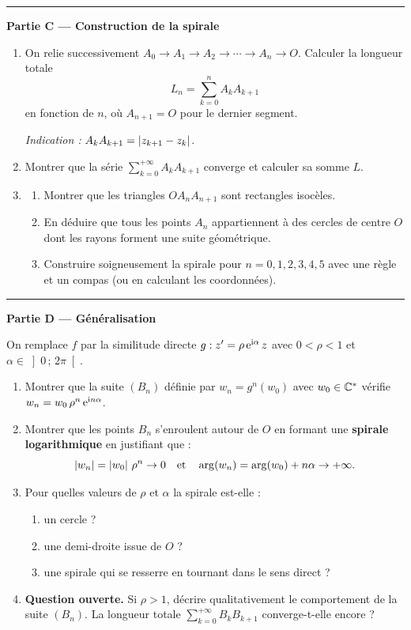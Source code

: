 \bigskip
\noindent\rule{\linewidth}{0.3pt}
\bigskip

\noindent\textbf{Partie C — Construction de la spirale}

\begin{enumerate}
	\item On relie successivement $A_0 \to A_1 \to A_2 \to \cdots \to A_n \to O$.
	Calculer la longueur totale
	$$
	L_n = \sum_{k=0}^{n} A_k A_{k+1}
	$$
	en fonction de $n$, où $A_{n+1} = O$ pour le dernier segment.

	\textit{Indication : } $A_kA_{k+1} = \left|z_{k+1} - z_k\right|$.

	\item Montrer que la série $\displaystyle\sum_{k=0}^{+\infty} A_k A_{k+1}$ converge
	et calculer sa somme $L$.

	\item \begin{enumerate}
		\item Montrer que les triangles $OA_nA_{n+1}$ sont rectangles isocèles.
		\item En déduire que tous les points $A_n$ appartiennent à des cercles
		de centre $O$ dont les rayons forment une suite géométrique.
		\item Construire soigneusement la spirale pour $n = 0, 1, 2, 3, 4, 5$
		avec une règle et un compas (ou en calculant les coordonnées).
	\end{enumerate}
\end{enumerate}

\bigskip
\noindent\rule{\linewidth}{0.3pt}
\bigskip

\noindent\textbf{Partie D — Généralisation}

On remplace $f$ par la similitude directe $g : z' = \rho\,\mathrm{e}^{\mathrm{i}\alpha}\,z$
avec $0 < \rho < 1$ et $\alpha \in \left]0\,;\,2\pi\right[$.

\begin{enumerate}
	\item Montrer que la suite $(B_n)$ définie par $w_n = g^n(w_0)$
	avec $w_0 \in \mathbb{C}^*$ vérifie $w_n = w_0\,\rho^n\,\mathrm{e}^{\mathrm{i} n\alpha}$.

	\item Montrer que les points $B_n$ s'enroulent autour de $O$ en formant
	une \textbf{spirale logarithmique} en justifiant que :
	$$
	\left|w_n\right| = \left|w_0\right|\,\rho^n \to 0 \quad \text{et} \quad
	\arg(w_n) = \arg(w_0) + n\alpha \to +\infty.
	$$

	\item Pour quelles valeurs de $\rho$ et $\alpha$ la spirale est-elle :
	\begin{enumerate}
		\item un cercle ?
		\item une demi-droite issue de $O$ ?
		\item une spirale qui se resserre en tournant dans le sens direct ?
	\end{enumerate}

	\item \textbf{Question ouverte.}
	Si $\rho > 1$, décrire qualitativement le comportement de la suite $(B_n)$.
	La longueur totale $\displaystyle\sum_{k=0}^{+\infty} B_k B_{k+1}$ converge-t-elle encore ?
\end{enumerate}


